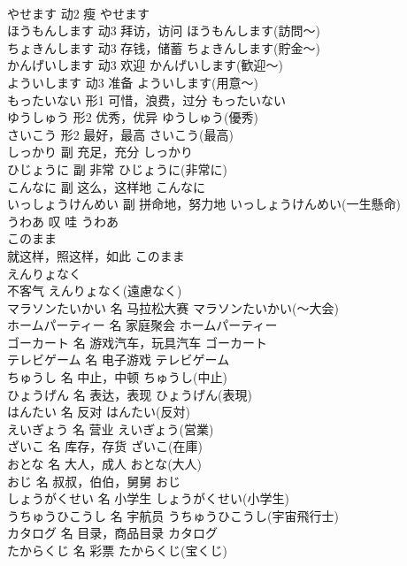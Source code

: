 \documentclass[8pt]{extreport}
\begin{document}
\begin{CJK}{UTF8}{min}
\\	やせます	动2	瘦	やせます	
\\	ほうもんします	动3	拜访，访问	ほうもんします(訪問～)	
\\	ちょきんします	动3	存钱，储蓄	ちょきんします(貯金～)	
\\	かんげいします	动3	欢迎	かんげいします(歓迎～)	
\\	よういします	动3	准备	よういします(用意～)	
\\	もったいない	形1	可惜，浪费，过分	もったいない	
\\	ゆうしゅう	形2	优秀，优异	ゆうしゅう(優秀)	
\\	さいこう	形2	最好，最高	さいこう(最高)	
\\	しっかり	副	充足，充分	しっかり	
\\	ひじょうに	副	非常	ひじょうに(非常に)	
\\	こんなに	副	这么，这样地	こんなに	
\\	いっしょうけんめい	副	拼命地，努力地	いっしょうけんめい(一生懸命)	
\\	うわあ	叹	哇	うわあ	
\\	このまま	
\\	就这样，照这样，如此	このまま	
\\	えんりょなく	
\\	不客气	えんりょなく(遠慮なく)	
\\	マラソンたいかい	名	马拉松大赛	マラソンたいかい(～大会)	
\\	ホームパーティー	名	家庭聚会	ホームパーティー	
\\	ゴーカート	名	游戏汽车，玩具汽车	ゴーカート	
\\	テレビゲーム	名	电子游戏	テレビゲーム	
\\	ちゅうし	名	中止，中顿	ちゅうし(中止)	
\\	ひょうげん	名	表达，表现	ひょうげん(表現)	
\\	はんたい	名	反对	はんたい(反対)	
\\	えいぎょう	名	营业	えいぎょう(営業)	
\\	ざいこ	名	库存，存货	ざいこ(在庫)	
\\	おとな	名	大人，成人	おとな(大人)	
\\	おじ	名	叔叔，伯伯，舅舅	おじ	
\\	しょうがくせい	名	小学生	しょうがくせい(小学生)	
\\	うちゅうひこうし	名	宇航员	うちゅうひこうし(宇宙飛行士)	
\\	カタログ	名	目录，商品目录	カタログ	
\\	たからくじ	名	彩票	たからくじ(宝くじ)	

\end{CJK}
\end{document}
